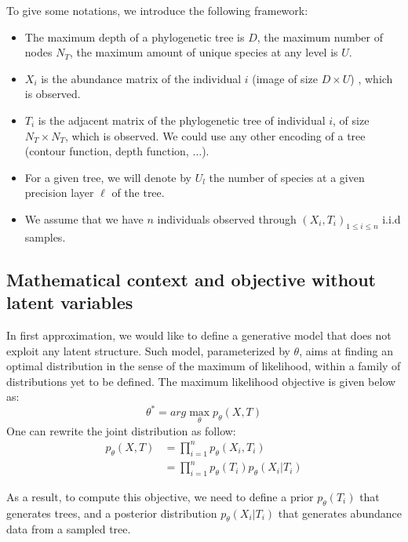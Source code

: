 To give some notations, we introduce the following framework:
\begin{itemize}
    \item The maximum depth of a phylogenetic tree is $D$, the maximum number of nodes $N_T$, the maximum amount of unique species at any level is $U$.
    \item $X_i$ is the abundance matrix of the individual $i$ (image of size $D \times U$) , which is observed.
    \item $T_i$ is the adjacent matrix of the phylogenetic tree of individual $i$, of size $N_T \times N_T$, which is observed.
    We could use any other encoding of a tree (contour function, depth function, $\dots$).
    \item For a given tree, we will denote by $U_{l}$ the number of species at a given precision layer $\ell$ of the tree.
    \item We assume that we have $n$ individuals observed through $(X_i, T_i)_{1 \leq i \leq n}$ i.i.d samples.
\end{itemize}

\subsection{Mathematical context and objective without latent variables}

In first approximation, we would like to define a generative model that does not exploit any latent structure.
Such model, parameterized by $\theta$, aims at finding an optimal distribution in the sense of the maximum of likelihood,
within a family of distributions yet to be defined.
The maximum likelihood objective is given below as:
$$
\theta^* = arg\max_{\theta} p_{\theta}(X, T)
$$
One can rewrite the joint distribution as follow:
$$
\begin{align}
    p_{\theta}(X, T) &= \prod_{i=1}^n p_{\theta}(X_i, T_i) \\
    &= \prod_{i=1}^n p_{\theta}(T_i) p_{\theta}(X_i | T_i)
\end{align}
$$

As a result, to compute this objective, we need to define a prior $p_{\theta}(T_i)$ that generates trees,
and a posterior distribution $p_{\theta}(X_i | T_i)$ that generates abundance data from a sampled tree. \\

